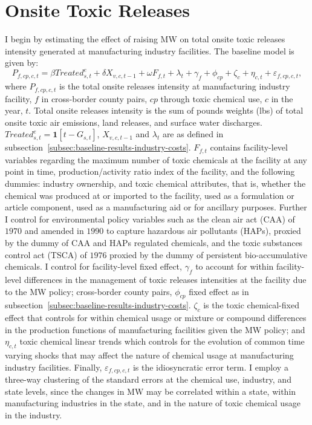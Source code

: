 \documentclass[12pt, english]{article}
\begin{document}
    \section{Onsite Toxic Releases}\label{sec:onsite-toxic-releases}
    I begin by estimating the effect of raising MW on total onsite toxic releases intensity generated at manufacturing industry facilities. The baseline model is given by:
    \begin{equation}
        P_{f,cp,c,t} = \beta Treated_{s,t}^e + \delta X_{v,c,t-1} + \omega F_{f,t} + \lambda_{t} + \gamma_{f} + \phi_{cp} + \zeta_{c} + \eta_{c,t} + \varepsilon_{f,cp,c,t},\label{eq:baseline-total-onsite-releases-intensity}
    \end{equation}
    where $P_{f,cp,c,t}$ is the total onsite releases intensity at manufacturing industry facility, $f$ in cross-border county pairs, $cp$ through toxic chemical use, $c$ in the year, $t$. Total onsite releases intensity is the sum of pounds weights (lbs) of total onsite toxic air emissions, land releases, and surface water discharges. $Treated_{s,t}^e = \textbf{1}[t - G_{s,t}]$, $X_{v,c,t-1}$ and $\lambda_{t}$ are as defined in subsection~\ref{subsec:baseline-results-industry-costs}. $F_{f,t}$ contains facility-level variables regarding the maximum number of toxic chemicals at the facility at any point in time, production/activity ratio index of the facility, and the following dummies: industry ownership, and toxic chemical attributes, that is, whether the chemical was produced at or imported to the facility, used as a formulation or article component, used as a manufacturing aid or for ancillary purposes. Further I control for environmental policy variables such as the clean air act (CAA) of $1970$ and amended in $1990$ to capture hazardous air pollutants (HAPs), proxied by the dummy of CAA and HAPs regulated chemicals, and the toxic substances control act (TSCA) of $1976$ proxied by the dummy of persistent bio-accumulative chemicals. I control for facility-level fixed effect, $\gamma_{f}$ to account for within facility-level differences in the management of toxic releases intensities at the facility due to the MW policy; cross-border county pairs, $\phi_{cp}$ fixed effect as in subsection~\ref{subsec:baseline-results-industry-costs}. $\zeta_{c}$ is the toxic chemical-fixed effect that controls for within chemical usage or mixture or compound differences in the production functions of manufacturing facilities given the MW policy; and $\eta_{c,t}$ toxic chemical linear trends which controls for the evolution of common time varying shocks that may affect the nature of chemical usage at manufacturing industry facilities. Finally, $\varepsilon_{f,cp,c,t}$ is the idiosyncratic error term. I employ a three-way clustering of the standard errors at the chemical use, industry, and state levels, since the changes in MW may be correlated within a state, within manufacturing industries in the state, and in the nature of toxic chemical usage in the industry.
    
\end{document}
